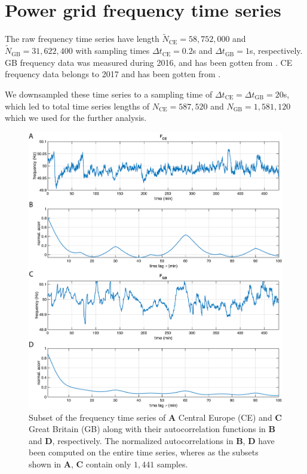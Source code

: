 \documentclass[entropy,article,submit,pdftex,moreauthors]{Definitions/mdpi}
\begin{document}
\section{Power grid frequency time series}\label{sec_power_grid_appendix}

The raw frequency time series have length $\tilde{N}_{\text{CE}}=58,752,000$ and $\tilde{N}_{\text{GB}}=31,622,400$ with sampling times $\Delta t_{\text{CE}}=0.2$\si{s} and 
$\Delta t_{\text{GB}}=1$\si{s}, respectively. GB frequency data was measured during 2016, and has been gotten from \cite{GB}. CE frequency data belongs to 2017 and has been gotten from \cite{haehne2018footprint}.

We downsampled these time series to a sampling time of $\Delta t_{\text{CE}}= \Delta t_{\text{GB}}=20$\si{s}, which led to total time series lengths of 
$N_{\text{CE}}=587,520$ and $N_{\text{GB}}=1,581,120$ which we used for the further analysis.

\begin{figure}
 \centering
 \includegraphics[width=\textwidth]{./figures/fig_power_grid_time_series}
 \caption{Subset of the frequency time series of \textbf{A} Central Europe (CE) \cite{haehne2018footprint} and \textbf{C} Great Britain (GB) \cite{GB} along with their autocorrelation functions in \textbf{B} and 
 \textbf{D}, respectively. The normalized autocorrelations in \textbf{B}, \textbf{D} have been computed on the entire time series, wheres as the subsets shown in \textbf{A}, \textbf{C} 
 contain only $1,441$ samples.}
\label{fig_power_grid_time_series}
\end{figure}
\end{document}
